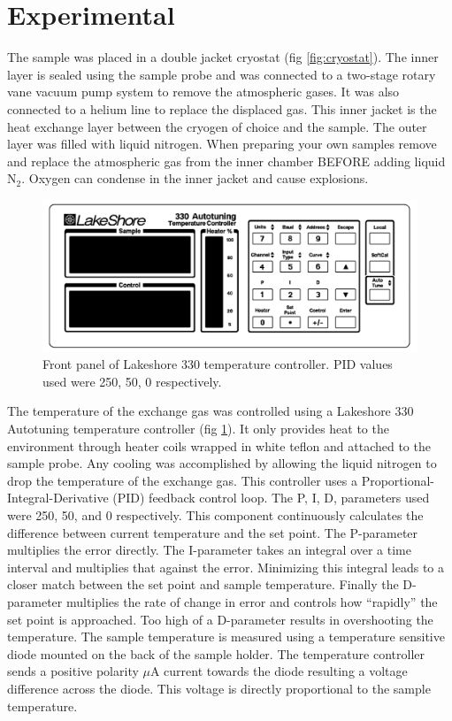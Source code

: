 \documentclass[
reprint,
amsmath,amssymb,
aps,
tikz,
border=5pt
]{revtex4-1}
\begin{document}
\section*{Experimental }


    The sample was placed in a double jacket cryostat (fig \ref{fig:cryostat}). The inner layer is sealed using the sample probe and was connected to a  two-stage rotary vane vacuum pump system to remove the atmospheric gases. It was also connected to a helium line to replace the displaced gas. This inner jacket is the heat exchange layer between the cryogen of choice and the sample. The outer layer was filled with liquid nitrogen. When preparing your own samples remove and replace the atmospheric gas from the inner chamber BEFORE adding liquid N$_2$. Oxygen can condense in the inner jacket and cause explosions. 


    \begin{figure}[b]
      \includegraphics[width=0.5 \textwidth]{figures/lakeshore.png}
      \caption{Front panel of Lakeshore 330 temperature controller. PID values used were 250, 50, 0 respectively.}
      \label{fig:lakeshore}
    \end{figure}

    
    The temperature of the exchange gas was controlled using a Lakeshore 330 Autotuning temperature controller (fig \ref{fig:lakeshore}). It only provides heat to the environment through heater coils wrapped in white teflon and attached to the sample probe. Any cooling was accomplished by allowing the liquid nitrogen to drop the temperature of the exchange gas. This controller uses a Proportional-Integral-Derivative (PID) feedback control loop. The P, I, D, parameters used were 250, 50, and 0 respectively. This component continuously  calculates the difference between current temperature and the set point. The P-parameter multiplies the error directly. The I-parameter takes an integral over a time interval and multiplies that against the error. Minimizing this integral leads to a closer match between the set point and sample temperature. Finally the D-parameter multiplies the rate of change in error and controls how ``rapidly'' the set point is approached. Too high of a D-parameter results in overshooting the temperature. The sample temperature is measured using a temperature sensitive diode mounted on the back of the sample holder. The temperature controller sends a positive polarity $\mu$A current towards the diode resulting a voltage difference across the diode. This voltage is directly proportional to the sample temperature. 
    
\end{document}
